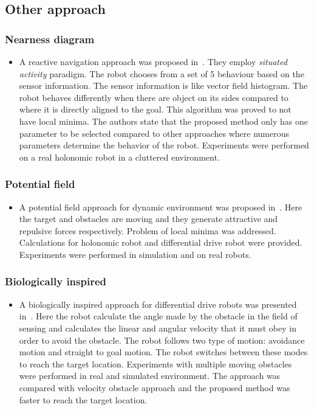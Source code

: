 \subsection{Other approach}%
\label{sub:other_approach}

\subsubsection{Nearness diagram}%
\label{ssub:nearness_diagram}
\begin{itemize}
    \item A reactive navigation approach was proposed in~\cite{minguez2004nearness}.
        They employ \textit{situated activity} paradigm. The robot chooses from a set of 5 behaviour
        based on the sensor information. The sensor information is like vector field histogram.
        The robot behaves differently when there are object on its sides compared to where it is 
        directly aligned to the goal. This algorithm was proved to not have local minima. The 
        authors state that the proposed method only has one parameter to be selected compared to 
        other approaches where numerous parameters determine the behavior of the robot. Experiments 
        were performed on a real holonomic robot in a cluttered environment.
\end{itemize}


\subsubsection{Potential field}%
\label{subsub:potential_field}
\begin{itemize}
    \item A potential field approach for dynamic environment was proposed in~\cite{ge2002dynamic}. 
        Here the target and obstacles are moving and they generate attractive and repulsive forces 
        respectively. Problem of local minima was addressed. Calculations for holonomic robot and 
        differential drive robot were provided. Experiments were performed in simulation and on real robots. 
\end{itemize}

\subsubsection{Biologically inspired}%
\label{subsub:biologically_inspired}
\begin{itemize}
    \item A biologically inspired approach for differential drive robots was presented 
        in~\cite{savkin2013simple}. Here the robot calculate the angle made by the obstacle in the 
        field of sensing and calculates the linear and angular velocity that it must obey in order 
        to avoid the obstacle. The robot follows two type of motion: avoidance motion and straight 
        to goal motion. The robot switches between these modes to reach the target location. 
        Experiments with multiple moving obstacles were performed in real and simulated environment. 
        The approach was compared with velocity obstacle approach and the proposed method was faster 
        to reach the target location.
\end{itemize}

